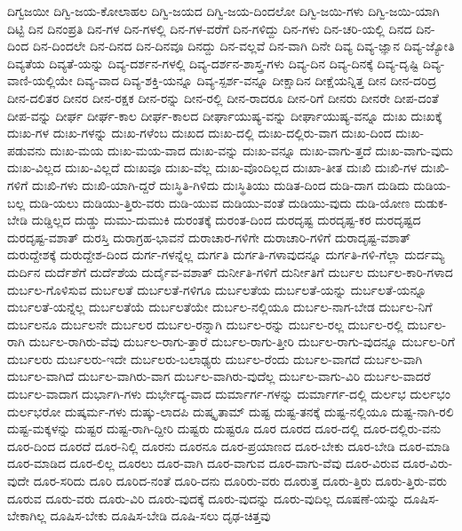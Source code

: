 {ದಿಗ್ವಜಯೀ
ದಿಗ್ವಿ-ಜಯ-ಕೋಲಾಹಲ
ದಿಗ್ವಿ-ಜಯದ
ದಿಗ್ವಿ-ಜಯ-ದಿಂದಲೋ
ದಿಗ್ವಿ-ಜಯಿ-ಗಳು
ದಿಗ್ವಿ-ಜಯಿ-ಯಾಗಿ
ದಿಟ್ಟಿ
ದಿನ
ದಿನಂಪ್ರತಿ
ದಿನ-ಗಳ
ದಿನ-ಗಳಲ್ಲಿ
ದಿನ-ಗಳ-ವರೆಗೆ
ದಿನ-ಗಳಿದ್ದು
ದಿನ-ಗಳು
ದಿನ-ಚರಿ-ಯಲ್ಲಿ
ದಿನದ
ದಿನ-ದಿಂದ
ದಿನ-ದಿಂದಲೇ
ದಿನ-ದಿನದ
ದಿನ-ದಿನವೂ
ದಿನದ್ದು
ದಿನ-ವಲ್ಲವೆ
ದಿನ-ವಾಗಿ
ದಿನೇ
ದಿವ್ಯ
ದಿವ್ಯ-ಜ್ಞಾನ
ದಿವ್ಯ-ಜ್ಯೋತಿ
ದಿವ್ಯತೆಯ
ದಿವ್ಯತೆ-ಯನ್ನು
ದಿವ್ಯ-ದರ್ಶನ-ಗಳಲ್ಲಿ
ದಿವ್ಯ-ದರ್ಶನ-ಶಾಸ್ತ್ರ-ಗಳು
ದಿವ್ಯ-ದಿನ
ದಿವ್ಯ-ದಿನಕ್ಕೆ
ದಿವ್ಯ-ದೃಷ್ಟಿ
ದಿವ್ಯ-ವಾಣಿ-ಯಲ್ಲಿಯೇ
ದಿವ್ಯ-ವಾದ
ದಿವ್ಯ-ಶಕ್ತಿ-ಯನ್ನೂ
ದಿವ್ಯ-ಸ್ಪರ್ಶ-ವನ್ನೂ
ದೀಕ್ಷಾದಿನ
ದೀಕ್ಷೆಯನ್ನಿತ್ತ
ದೀನ
ದೀನ-ದರಿದ್ರ
ದೀನ-ದಲಿತರ
ದೀನರ
ದೀನ-ರಕ್ಷಕ
ದೀನ-ರನ್ನು
ದೀನ-ರಲ್ಲಿ
ದೀನ-ರಾದರೂ
ದೀನ-ರಿಗೆ
ದೀನರು
ದೀನರೇ
ದೀಪ-ದಂತೆ
ದೀಪ-ವನ್ನು
ದೀರ್ಘ
ದೀರ್ಘ-ಕಾಲ
ದೀರ್ಘ-ಕಾಲದ
ದೀರ್ಘಾಯುಷ್ಯ-ವನ್ನು
ದೀರ್ಘಾಯುಷ್ಯ-ವನ್ನೂ
ದುಃಖ
ದುಃಖಕ್ಕೆ
ದುಃಖ-ಗಳ
ದುಃಖ-ಗಳನ್ನು
ದುಃಖ-ಗಳೆಂಬ
ದುಃಖದ
ದುಃಖ-ದಲ್ಲಿ
ದುಃಖ-ದಲ್ಲಿರು-ವಾಗ
ದುಃಖ-ದಿಂದ
ದುಃಖ-ಪಡುವನು
ದುಃಖ-ಮಯ
ದುಃಖ-ಮಯ-ವಾದ
ದುಃಖ-ವನ್ನು
ದುಃಖ-ವನ್ನೂ
ದುಃಖ-ವಾಗು-ತ್ತದೆ
ದುಃಖ-ವಾಗು-ವುದು
ದುಃಖ-ವಿಲ್ಲದ
ದುಃಖ-ವಿಲ್ಲದೆ
ದುಃಖವೂ
ದುಃಖ-ವೆಲ್ಲ
ದುಃಖ-ವೊಂದಿಲ್ಲದ
ದುಃಖಾ-ತೀತ
ದುಃಖಿ
ದುಃಖಿ-ಗಳ
ದುಃಖಿ-ಗಳಿಗೆ
ದುಃಖಿ-ಗಳು
ದುಃಖಿ-ಯಾಗಿ-ದ್ದರೆ
ದುಃಸ್ಥಿತಿ-ಗಿಳಿದು
ದುಃಸ್ಥಿತಿಯು
ದುಡಿತ-ದಿಂದ
ದುಡಿ-ದಾಗ
ದುಡಿದು
ದುಡಿಯ-ಬಲ್ಲ
ದುಡಿ-ಯಲು
ದುಡಿಯು-ತ್ತಿರು-ವರು
ದುಡಿ-ಯುವ
ದುಡಿಯು-ವಂತೆ
ದುಡಿಯು-ವುದು
ದುಡಿ-ಯೋಣ
ದುಡುಕ-ಬೇಡಿ
ದುಡ್ಡಿಲ್ಲದ
ದುಡ್ಡು
ದುಮು-ದುಮುಕಿ
ದುರಂತಕ್ಕೆ
ದುರಂತ-ದಿಂದ
ದುರದೃಷ್ಟ
ದುರದೃಷ್ಟ-ಕರ
ದುರದೃಷ್ಟದ
ದುರದೃಷ್ಟ-ವಶಾತ್
ದುರಸ್ತಿ
ದುರಾಗ್ರಹ-ಭಾವನೆ
ದುರಾಚಾರ-ಗಳಿಗೇ
ದುರಾಚಾರಿ-ಗಳಿಗೆ
ದುರಾದೃಷ್ಟ-ವಶಾತ್
ದುರುದ್ದೇಶಕ್ಕೆ
ದುರುದ್ದೇಶ-ದಿಂದ
ದುರ್ಗ-ಗಳನ್ನೆಲ್ಲ
ದುರ್ಗತಿ
ದುರ್ಗತಿ-ಗಳಾವುದನ್ನೂ
ದುರ್ಗತಿ-ಗಳಿ-ಗೆಲ್ಲಾ
ದುರ್ದಮ್ಯ
ದುರ್ದಿನ
ದುರ್ದೆಶೆಗೆ
ದುರ್ದೆಶೆಯ
ದುರ್ದೈವ-ವಶಾತ್
ದುರ್ನೀತಿ-ಗಳಿಗೆ
ದುರ್ನೀತಿಗೆ
ದುರ್ಬಲ
ದುರ್ಬಲ-ಕಾರಿ-ಗಳಾದ
ದುರ್ಬಲ-ಗೊಳಿಸುವ
ದುರ್ಬಲತೆ
ದುರ್ಬಲತೆ-ಗಳಿಗೂ
ದುರ್ಬಲತೆಯ
ದುರ್ಬಲತೆ-ಯನ್ನು
ದುರ್ಬಲತೆ-ಯನ್ನೂ
ದುರ್ಬಲತೆ-ಯನ್ನೆಲ್ಲ
ದುರ್ಬಲತೆಯೆ
ದುರ್ಬಲತೆಯೇ
ದುರ್ಬಲ-ನಲ್ಲಿಯೂ
ದುರ್ಬಲ-ನಾಗ-ಬೇಡ
ದುರ್ಬಲ-ನಿಗೆ
ದುರ್ಬಲನೂ
ದುರ್ಬಲನೇ
ದುರ್ಬಲರ
ದುರ್ಬಲ-ರನ್ನಾಗಿ
ದುರ್ಬಲ-ರನ್ನು
ದುರ್ಬಲ-ರಲ್ಲ
ದುರ್ಬಲ-ರಲ್ಲಿ
ದುರ್ಬಲ-ರಾಗಿ
ದುರ್ಬಲ-ರಾಗಿರು-ವೆವು
ದುರ್ಬಲ-ರಾಗು-ತ್ತಾರೆ
ದುರ್ಬಲ-ರಾಗು-ತ್ತೀರಿ
ದುರ್ಬಲ-ರಾಗು-ವುದನ್ನೂ
ದುರ್ಬಲ-ರಿಗೆ
ದುರ್ಬಲರು
ದುರ್ಬಲರು-ಇದೇ
ದುರ್ಬಲರು-ಬಲಾಢ್ಯರು
ದುರ್ಬಲ-ರೆಂದು
ದುರ್ಬಲ-ವಾಗದೆ
ದುರ್ಬಲ-ವಾಗಿ
ದುರ್ಬಲ-ವಾಗಿದೆ
ದುರ್ಬಲ-ವಾಗಿರು-ವಾಗ
ದುರ್ಬಲ-ವಾಗಿರು-ವುದೆಲ್ಲ
ದುರ್ಬಲ-ವಾಗು-ವಿರಿ
ದುರ್ಬಲ-ವಾದರೆ
ದುರ್ಬಲ-ವಾದಾಗ
ದುರ್ಭಾಗಿ-ಗಳು
ದುರ್ಭೇದ್ಯ-ವಾದ
ದುರ್ಮಾರ್ಗ-ಗಳನ್ನು
ದುರ್ಮಾರ್ಗ-ದಲ್ಲಿ
ದುರ್ಲಭ
ದುರ್ಲಭಂ
ದುರ್ಲಭರೋ
ದುಷ್ಕರ್ಮ-ಗಳು
ದುಷ್ಕು-ಲಾದಪಿ
ದುಷ್ಕೃತಾಮ್
ದುಷ್ಟ
ದುಷ್ಟ-ತನಕ್ಕೆ
ದುಷ್ಟ-ನಲ್ಲಿಯೂ
ದುಷ್ಟ-ನಾಗಿ-ರಲಿ
ದುಷ್ಟ-ಮಕ್ಕಳನ್ನು
ದುಷ್ಟರ
ದುಷ್ಟ-ರಾಗಿ-ದ್ದೀರಿ
ದುಷ್ಟರು
ದುಷ್ಟರೂ
ದೂರ
ದೂರದ
ದೂರ-ದಲ್ಲಿ
ದೂರ-ದಲ್ಲಿರು-ವನು
ದೂರ-ದಿಂದ
ದೂರದೆ
ದೂರ-ನಿಲ್ಲಿ
ದೂರನು
ದೂರನೂ
ದೂರ-ಪ್ರಯಾಣದ
ದೂರ-ಬೇಕು
ದೂರ-ಬೇಡಿ
ದೂರ-ಮಾಡಿ
ದೂರ-ಮಾಡಿದ
ದೂರ-ಲಿಲ್ಲ
ದೂರಲು
ದೂರ-ವಾಗಿ
ದೂರ-ವಾಗುವ
ದೂರ-ವಾಗು-ವೆವು
ದೂರ-ವಿರುವ
ದೂರ-ವಿರು-ವುದೇ
ದೂರ-ಸರಿದು
ದೂರಿ
ದೂರಿದ-ನಂತೆ
ದೂರಿ-ದನು
ದೂರಿರು-ವರು
ದೂರುತ್ತ
ದೂರು-ತ್ತಿರು
ದೂರು-ತ್ತಿರು-ವರು
ದೂರುವ
ದೂರು-ವರು
ದೂರು-ವಿರಿ
ದೂರು-ವುದಕ್ಕೆ
ದೂರು-ವುದನ್ನು
ದೂರು-ವುದಿಲ್ಲ
ದೂಷಣೆ-ಯನ್ನು
ದೂಷಿಸ-ಬೇಕಾಗಿಲ್ಲ
ದೂಷಿಸ-ಬೇಕು
ದೂಷಿಸ-ಬೇಡಿ
ದೂಷಿ-ಸಲು
ದೃಢ-ಚಿತ್ತವು
}
